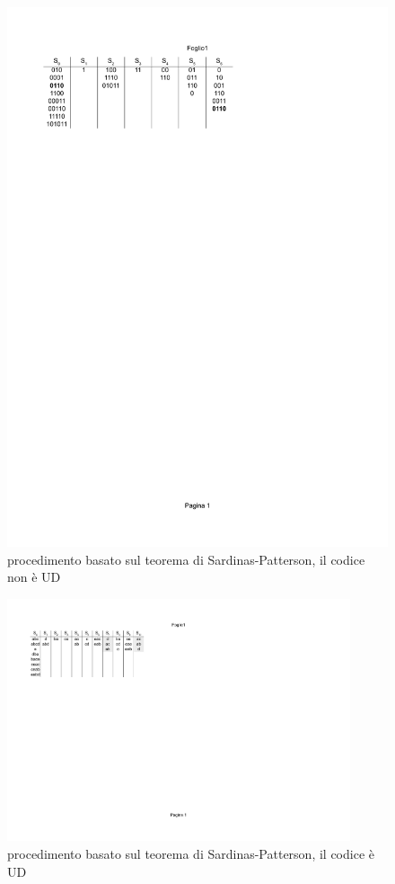 \begin{figure}[htp]
\begin{center}
	\includegraphics[width=\textwidth]{img/patt2.pdf}
\caption{procedimento basato sul teorema di Sardinas-Patterson, il codice non è UD}
\label{fig:0020}
\end{center}
\end{figure}

\begin{figure}[htp]
\begin{center}
	\includegraphics[width=0.9\textwidth]{img/patt3.pdf}
\caption{procedimento basato sul teorema di Sardinas-Patterson, il codice è UD}
\label{fig:0021}
\end{center}
\end{figure}

